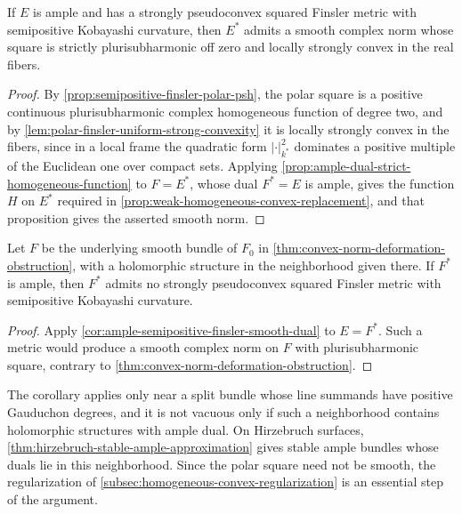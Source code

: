 \begin{corollary}\label{cor:ample-semipositive-finsler-smooth-dual}
If $E$ is ample and has a strongly pseudoconvex squared Finsler metric with semipositive Kobayashi curvature, then $E^*$ admits a smooth complex norm whose square is strictly plurisubharmonic off zero and locally strongly convex in the real fibers.
\end{corollary}
\begin{proof}
By \cref{prop:semipositive-finsler-polar-psh}, the polar square is a positive continuous plurisubharmonic complex homogeneous function of degree two, and by \cref{lem:polar-finsler-uniform-strong-convexity} it is locally strongly convex in the fibers, since in a local frame the quadratic form $|\cdot|_{k^*}^2$ dominates a positive multiple of the Euclidean one over compact sets. Applying \cref{prop:ample-dual-strict-homogeneous-function} to $F=E^*$, whose dual $F^*=E$ is ample, gives the function $H$ on $E^*$ required in \cref{prop:weak-homogeneous-convex-replacement}, and that proposition gives the asserted smooth norm.
\end{proof}

\begin{corollary}\label{cor:gauduchon-semipositive-finsler-obstruction}
Let $F$ be the underlying smooth bundle of $F_0$ in \cref{thm:convex-norm-deformation-obstruction}, with a holomorphic structure in the neighborhood given there. If $F^*$ is ample, then $F^*$ admits no strongly pseudoconvex squared Finsler metric with semipositive Kobayashi curvature.
\end{corollary}
\begin{proof}
Apply \cref{cor:ample-semipositive-finsler-smooth-dual} to $E=F^*$. Such a metric would produce a smooth complex norm on $F$ with plurisubharmonic square, contrary to \cref{thm:convex-norm-deformation-obstruction}.
\end{proof}

The corollary applies only near a split bundle whose line summands have positive Gauduchon degrees, and it is not vacuous only if such a neighborhood contains holomorphic structures with ample dual. On Hirzebruch surfaces, \cref{thm:hirzebruch-stable-ample-approximation} gives stable ample bundles whose duals lie in this neighborhood. Since the polar square need not be smooth, the regularization of \cref{subsec:homogeneous-convex-regularization} is an essential step of the argument.
